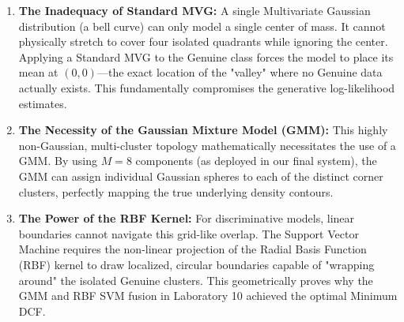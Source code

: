 \begin{enumerate}
    \item \textbf{The Inadequacy of Standard MVG:} A single Multivariate Gaussian distribution (a bell curve) can only model a single center of mass. It cannot physically stretch to cover four isolated quadrants while ignoring the center. Applying a Standard MVG to the Genuine class forces the model to place its mean at $(0,0)$—the exact location of the "valley" where no Genuine data actually exists. This fundamentally compromises the generative log-likelihood estimates.
    \item \textbf{The Necessity of the Gaussian Mixture Model (GMM):} This highly non-Gaussian, multi-cluster topology mathematically necessitates the use of a GMM. By using $M=8$ components (as deployed in our final system), the GMM can assign individual Gaussian spheres to each of the distinct corner clusters, perfectly mapping the true underlying density contours.
    \item \textbf{The Power of the RBF Kernel:} For discriminative models, linear boundaries cannot navigate this grid-like overlap. The Support Vector Machine requires the non-linear projection of the Radial Basis Function (RBF) kernel to draw localized, circular boundaries capable of "wrapping around" the isolated Genuine clusters. This geometrically proves why the GMM and RBF SVM fusion in Laboratory 10 achieved the optimal Minimum DCF.
\end{enumerate}